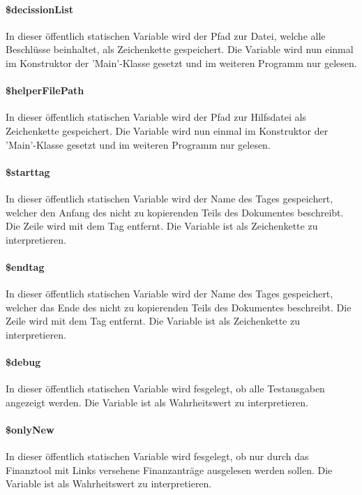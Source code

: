 \documentclass[12pt,parskip=full, pagea4]{scrartcl}
\begin{document}
	\paragraph{\$decissionList} In dieser öffentlich statischen Variable wird der Pfad zur Datei, welche alle Beschlüsse beinhaltet, als Zeichenkette gespeichert. Die Variable wird nun einmal im Konstruktor der 'Main'-Klasse gesetzt und im weiteren Programm nur gelesen.
	
	\paragraph{\$helperFilePath} In dieser öffentlich statischen Variable wird der Pfad zur Hilfsdatei als Zeichenkette gespeichert. Die Variable wird nun einmal im Konstruktor der 'Main'-Klasse gesetzt und im weiteren Programm nur gelesen.
	
	\paragraph{\$starttag} In dieser öffentlich statischen Variable wird der Name des Tages gespeichert, welcher den Anfang des nicht zu kopierenden Teils des Dokumentes beschreibt. Die Zeile wird mit dem Tag entfernt. Die Variable ist als Zeichenkette zu interpretieren.
	
	\paragraph{\$endtag} In dieser öffentlich statischen Variable wird der Name des Tages gespeichert, welcher das Ende des nicht zu kopierenden Teils des Dokumentes beschreibt. Die Zeile wird mit dem Tag entfernt. Die Variable ist als Zeichenkette zu interpretieren.
	
	\paragraph{\$debug} In dieser öffentlich statischen Variable wird fesgelegt, ob alle Testausgaben angezeigt werden. Die Variable ist als Wahrheitswert zu interpretieren.
	
	\paragraph{\$onlyNew} In dieser öffentlich statischen Variable wird fesgelegt, ob nur durch das Finanztool mit Links versehene Finanzanträge ausgelesen werden sollen. Die Variable ist als Wahrheitswert zu interpretieren.
	
\end{document}
